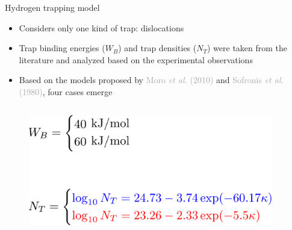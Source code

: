 \documentclass[9pt]{beamer}
\begin{document}
\begin{frame}{Hydrogen trapping model}

\begin{itemize}
	\item Considers only one kind of trap: dislocations
	\vspace{0.1cm}
	\item Trap binding energies ($W_B$) and trap densities ($N_T$) were taken from the literature and analyzed based on the experimental observations
	\vspace{0.1cm}
	\item Based on the models proposed by \textcolor{darkgray}{Moro \textit{et al.} (2010)} and \textcolor{darkgray}{Sofronis \textit{et al.} (1980)}, four cases emerge
\end{itemize}

\begin{columns}
	\begin{column}{0.55\textwidth}
	\begin{figure}
		\centering
		\includegraphics[width=0.95\textwidth]{Images/cases.pdf} \\
	\end{figure}
	\end{column}
	

\end{columns}
\end{frame}
\end{document}
